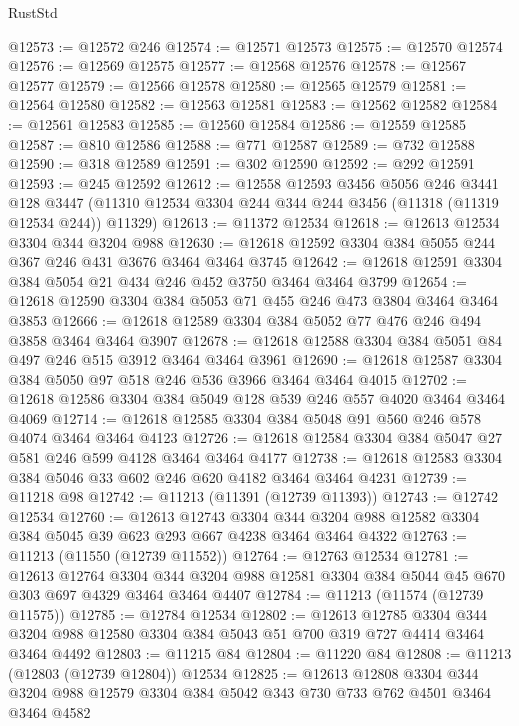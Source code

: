 \begin{lexlean}{RustStd}
\begin{coremodule}
{{{{{{{{{{{{{{{{{{{@12573 := @12572 @246
@12574 := @12571 @12573
@12575 := @12570 @12574
@12576 := @12569 @12575
@12577 := @12568 @12576
@12578 := @12567 @12577
@12579 := @12566 @12578
@12580 := @12565 @12579
@12581 := @12564 @12580
@12582 := @12563 @12581
@12583 := @12562 @12582
@12584 := @12561 @12583
@12585 := @12560 @12584
@12586 := @12559 @12585
@12587 := @810 @12586
@12588 := @771 @12587
@12589 := @732 @12588
@12590 := @318 @12589
@12591 := @302 @12590
@12592 := @292 @12591
@12593 := @245 @12592
@12612 := @12558
    @12593
    @3456
    @5056
    @246
    @3441
    @128
    @3447
    (@11310 @12534 @3304 @244 @344 @244 @3456 (@11318 (@11319 @12534 @244)) @11329)
@12613 := @11372 @12534
@12618 := @12613 @12534 @3304 @344 @3204 @988
@12630 := @12618 @12592 @3304 @384 @5055 @244 @367 @246 @431 @3676 @3464 @3464 @3745
@12642 := @12618 @12591 @3304 @384 @5054 @21 @434 @246 @452 @3750 @3464 @3464 @3799
@12654 := @12618 @12590 @3304 @384 @5053 @71 @455 @246 @473 @3804 @3464 @3464 @3853
@12666 := @12618 @12589 @3304 @384 @5052 @77 @476 @246 @494 @3858 @3464 @3464 @3907
@12678 := @12618 @12588 @3304 @384 @5051 @84 @497 @246 @515 @3912 @3464 @3464 @3961
@12690 := @12618 @12587 @3304 @384 @5050 @97 @518 @246 @536 @3966 @3464 @3464 @4015
@12702 := @12618 @12586 @3304 @384 @5049 @128 @539 @246 @557 @4020 @3464 @3464 @4069
@12714 := @12618 @12585 @3304 @384 @5048 @91 @560 @246 @578 @4074 @3464 @3464 @4123
@12726 := @12618 @12584 @3304 @384 @5047 @27 @581 @246 @599 @4128 @3464 @3464 @4177
@12738 := @12618 @12583 @3304 @384 @5046 @33 @602 @246 @620 @4182 @3464 @3464 @4231
@12739 := @11218 @98
@12742 := @11213 (@11391 (@12739 @11393))
@12743 := @12742 @12534
@12760 := @12613
    @12743
    @3304
    @344
    @3204
    @988
    @12582
    @3304
    @384
    @5045
    @39
    @623
    @293
    @667
    @4238
    @3464
    @3464
    @4322
@12763 := @11213 (@11550 (@12739 @11552))
@12764 := @12763 @12534
@12781 := @12613
    @12764
    @3304
    @344
    @3204
    @988
    @12581
    @3304
    @384
    @5044
    @45
    @670
    @303
    @697
    @4329
    @3464
    @3464
    @4407
@12784 := @11213 (@11574 (@12739 @11575))
@12785 := @12784 @12534
@12802 := @12613
    @12785
    @3304
    @344
    @3204
    @988
    @12580
    @3304
    @384
    @5043
    @51
    @700
    @319
    @727
    @4414
    @3464
    @3464
    @4492
@12803 := @11215 @84
@12804 := @11220 @84
@12808 := @11213 (@12803 (@12739 @12804)) @12534
@12825 := @12613
    @12808
    @3304
    @344
    @3204
    @988
    @12579
    @3304
    @384
    @5042
    @343
    @730
    @733
    @762
    @4501
    @3464
    @3464
    @4582
}}}}}}}}}}}}}}}}}}}
\end{coremodule}
\end{lexlean}
